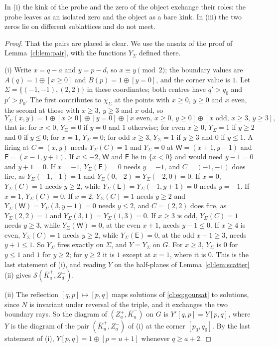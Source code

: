 In (i) the kink of the probe and the zero of the object exchange their roles: the probe leaves as an isolated zero and the object as a bare kink. In (iii) the two zeros lie on different sublattices and do not meet.

\begin{proof}
That the pairs are placed is clear. We use the ansatz of the proof of Lemma~\ref{cl:lem:pair}, with the functions $Y_\Sigma$ defined there.

(i) Write $x=q-a$ and $y=p-d$, so $x\equiv y\pmod2$; the boundary values are $A(q)=1\oplus[x\ge0]$ and $B(p)=1\oplus[y=0]$, and the corner value is $1$. Let $\Sigma=\{(-1,-1),(2,2)\}$ in these coordinates; both centres have $q'>q_0$ and $p'>p_0$. The first contributes to $\chi_\Sigma$ at the points with $x\ge0$, $y\ge0$ and $x$ even, the second at those with $x\ge3$, $y\ge3$ and $x$ odd, so
\[
Y_\Sigma(x,y)=1\oplus[x\ge0]\oplus[y=0]\oplus[x\text{ even},\,x\ge0,\,y\ge0]\oplus[x\text{ odd},\,x\ge3,\,y\ge3],
\]
that is: for $x<0$, $Y_\Sigma=0$ if $y=0$ and $1$ otherwise; for even $x\ge0$, $Y_\Sigma=1$ if $y\ge2$ and $0$ if $y\le0$; for $x=1$, $Y_\Sigma=0$; for odd $x\ge3$, $Y_\Sigma=1$ if $y\ge3$ and $0$ if $y\le1$. A firing at $C=(x,y)$ needs $Y_\Sigma(C)=1$ and $Y_\Sigma=0$ at $\mathsf W=(x+1,y-1)$ and $\mathsf E=(x-1,y+1)$. If $x\le-2$, $\mathsf W$ and $\mathsf E$ lie in $\{x<0\}$ and would need $y-1=0$ and $y+1=0$. If $x=-1$, $Y_\Sigma(\mathsf E)=0$ needs $y=-1$, and $C=(-1,-1)$ does fire, as $Y_\Sigma(-1,-1)=1$ and $Y_\Sigma(0,-2)=Y_\Sigma(-2,0)=0$. If $x=0$, $Y_\Sigma(C)=1$ needs $y\ge2$, while $Y_\Sigma(\mathsf E)=Y_\Sigma(-1,y+1)=0$ needs $y=-1$. If $x=1$, $Y_\Sigma(C)=0$. If $x=2$, $Y_\Sigma(C)=1$ needs $y\ge2$ and $Y_\Sigma(\mathsf W)=Y_\Sigma(3,y-1)=0$ needs $y\le2$, and $C=(2,2)$ does fire, as $Y_\Sigma(2,2)=1$ and $Y_\Sigma(3,1)=Y_\Sigma(1,3)=0$. If $x\ge3$ is odd, $Y_\Sigma(C)=1$ needs $y\ge3$, while $Y_\Sigma(\mathsf W)=0$, at the even $x+1$, needs $y-1\le0$. If $x\ge4$ is even, $Y_\Sigma(C)=1$ needs $y\ge2$, while $Y_\Sigma(\mathsf E)=0$, at the odd $x-1\ge3$, needs $y+1\le1$. So $Y_\Sigma$ fires exactly on $\Sigma$, and $Y=Y_\Sigma$ on $G$. For $x\ge3$, $Y_\Sigma$ is $0$ for $y\le1$ and $1$ for $y\ge2$; for $y\ge2$ it is $1$ except at $x=1$, where it is $0$. This is the last statement of (i), and reading $Y$ on the half-planes of Lemma~\ref{cl:lem:scatter}(ii) gives $\mathcal S(\bar K^+_a,Z^-_d)$.

(ii) The reflection $[q,p]\mapsto[p,q]$ maps solutions of \eqref{cl:eq:goursat} to solutions, since $N$ is invariant under reversal of the triple, and it exchanges the two boundary rays. So the diagram of $(Z^+_a,\bar K^-_u)$ on $G$ is $Y'[q,p]=Y[p,q]$, where $Y$ is the diagram of the pair $(\bar K^+_u,Z^-_a)$ of (i) at the corner $[p_0,q_0]$. By the last statement of (i), $Y[p,q]=1\oplus[p=u+1]$ whenever $q\ge a+2$.


\end{proof}
